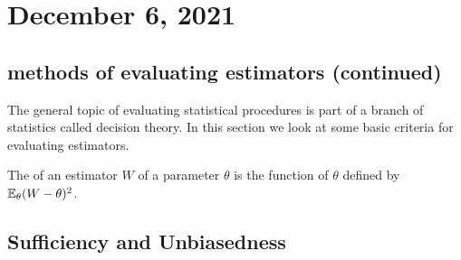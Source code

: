 \section{December 6, 2021}
\subsection{methods of evaluating estimators (continued)}
The general topic of evaluating statistical procedures is part of a branch of statistics called decision theory. In this section we look at some basic criteria for evaluating estimators.
    
\begin{definition}
    The  of an estimator $W$ of a parameter $\theta$ is the function of $\theta$ defined by $\mathbb E_{\theta}(W-\theta)^2$.
\end{definition}

\subsection{Sufficiency and Unbiasedness}